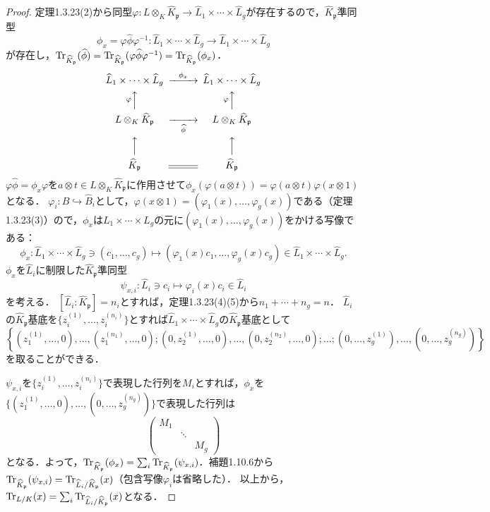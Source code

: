\begin{proof}
  定理1.3.23(2)から同型$\varphi \colon L \otimes_K \widehat{K}_\mathfrak{p} \to \widehat{L}_1 \times \cdots \times \widehat{L}_g$が存在するので，$\widehat{K}_\mathfrak{p}$準同型
  \[\phi_x=\varphi\widehat{\phi}\varphi^{-1} \colon \widehat{L}_1\times\cdots\times\widehat{L}_g\to \widehat{L}_1\times\cdots\times\widehat{L}_g\]
  が存在し，$\operatorname{Tr}_{\widehat{K}_\mathfrak{p}}(\widehat{\phi})=\operatorname{Tr}_{\widehat{K}_\mathfrak{p}}(\varphi\widehat{\phi}\varphi^{-1})=\operatorname{Tr}_{\widehat{K}_\mathfrak{p}}(\phi_x)$．
  \[
  \begin{CD}
    \widehat{L}_1\times\cdots\times\widehat{L}_g @>{\phi_x}>> \widehat{L}_1\times\cdots\times\widehat{L}_g\\
    @A{\varphi}AA  @A{\varphi}AA\\
    L\otimes_K\widehat{K}_\mathfrak{p} @>>{\widehat{\phi}}> L\otimes_K\widehat{K}_\mathfrak{p}\\
    @AAA @AAA\\
    \widehat{K}_\mathfrak{p} @= \widehat{K}_\mathfrak{p}
  \end{CD}
  \]
  $\varphi\widehat{\phi}=\phi_x\varphi$を$a\otimes t\in L\otimes_K\widehat{K}_\mathfrak{p}$に作用させて$\phi_x(\varphi(a\otimes t)) = \varphi(a\otimes t)\varphi(x\otimes1)$となる．
  $\varphi_i \colon B\hookrightarrow\widehat{B}_i$として，$\varphi(x\otimes1) = (\varphi_1(x), \ldots, \varphi_g(x))$である（定理1.3.23(3)）ので，$\phi_x$は$L_1\times\cdots\times L_g$の元に$(\varphi_1(x), \ldots, \varphi_g(x))$をかける写像である：
  \[\phi_x\colon\widehat{L}_1\times\cdots\times\widehat{L}_g\ni (c_1,\ldots,c_g)\mapsto(\varphi_1(x)c_1, \ldots, \varphi_g(x)c_g)\in \widehat{L}_1\times\cdots\times\widehat{L}_g.\]
  $\phi_x$を$\widehat{L}_i$に制限した$\widehat{K}_\mathfrak{p}$準同型
  \[\psi_{x,i}\colon\widehat{L}_i\ni c_i\mapsto \varphi_i(x)c_i\in\widehat{L}_i\]
  を考える．
  $[\widehat{L}_i:\widehat{K}_\mathfrak{p}]=n_i$とすれば，定理1.3.23(4)(5)から$n_1+\cdots+n_g=n$．
  $\widehat{L}_i$の$\widehat{K}_\mathfrak{p}$基底を$\{z_i^{(1)},\ldots,z_i^{(n_i)}\}$とすれば$\widehat{L}_1\times\cdots\times\widehat{L}_g$の$\widehat{K}_\mathfrak{p}$基底として
  \[\left\{(z_1^{(1)},\ldots,0),\ldots,(z_1^{(n_1)},\ldots,0);(0,z_2^{(1)},\ldots,0),\ldots,(0,z_2^{(n_2)},\ldots,0);\ldots;(0,\ldots,z_g^{(1)}),\ldots,(0,\ldots,z_g^{(n_g)})\right\}\]
  を取ることができる．

  $\psi_{x,i}$を$\{z_i^{(1)},\ldots,z_i^{(n_i)}\}$で表現した行列を$M_i$とすれば，$\phi_x$を$\{(z_1^{(1)},\ldots,0),\ldots,(0,\ldots,z_g^{(n_g)})\}$で表現した行列は
  \[
  \begin{pmatrix}
    M_1 &        & \\
    & \ddots & \\
    &        & M_g
  \end{pmatrix}
  \]
  となる．よって，$\operatorname{Tr}_{\widehat{K}_\mathfrak{p}}(\phi_x)=\sum_i\operatorname{Tr}_{\widehat{K}_\mathfrak{p}}(\psi_{x,i})$．補題1.10.6から$\operatorname{Tr}_{\widehat{K}_\mathfrak{p}}(\psi_{x,i})=\operatorname{Tr}_{\widehat{L}_i/\widehat{K}_\mathfrak{p}}(x)$（包含写像$\varphi_i$は省略した）．
  以上から，$\operatorname{Tr}_{L/K}(x)=\sum_i\operatorname{Tr}_{\widehat{L}_i/\widehat{K}_\mathfrak{p}}(x)$となる．
\end{proof}

